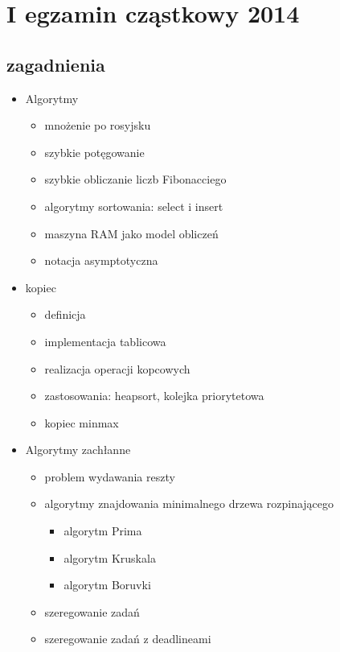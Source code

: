 \documentclass[svgnames]{report}
\begin{document}


\part{I egzamin cząstkowy 2014}
\chapter{zagadnienia}

\begin{itemize}

\item Algorytmy
\begin{itemize}
	\item mnożenie po rosyjsku
	\item szybkie potęgowanie
	\item szybkie obliczanie liczb Fibonacciego
	\item algorytmy sortowania: select i insert
	\item maszyna RAM jako model obliczeń
	\item notacja asymptotyczna
\end{itemize}
	\item kopiec
	\begin{itemize}
		\item definicja
		\item implementacja tablicowa
		\item realizacja operacji kopcowych
		\item zastosowania: heapsort, kolejka priorytetowa
		\item kopiec minmax
	\end{itemize}
	

\item Algorytmy zachłanne
\begin{itemize}
	\item problem wydawania reszty
	\item algorytmy znajdowania minimalnego drzewa rozpinającego
	\begin{itemize}
		\item algorytm Prima
		\item algorytm Kruskala
		\item algorytm Boruvki
	\end{itemize}
	\item szeregowanie zadań
	\item szeregowanie zadań z deadlineami
\end{itemize}


\end{itemize}
\end{document}
